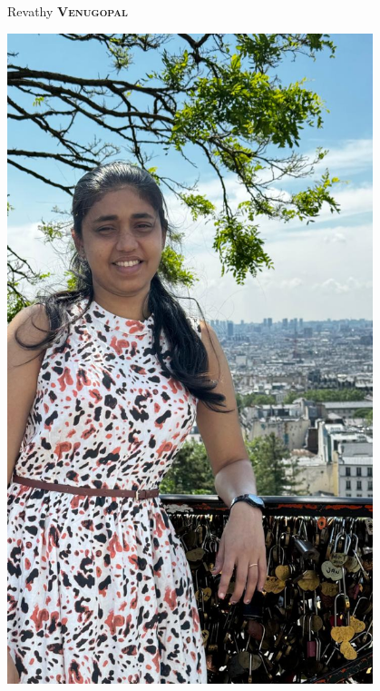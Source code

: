 \documentclass[11pt, a4paper]{article}
\begin{document}
\setlength{\topskip}{0pt}
\setlength{\parindent}{0pt}
\setlength{\parskip}{0pt}
\setlength{\fboxsep}{0pt}
\pagestyle{empty}
\raggedbottom

\begin{minipage}[t]{0.33\textwidth} %
\colorbox{cvblue}{\begin{minipage}[t][5mm][t]{\textwidth}\null\hfill\null\end{minipage}}

\vspace{-.2ex} %
\colorbox{cvblue!90}{\color{white}  %
\textwidth\relax%
\begin{minipage}[t][293mm][t]{0.82\textwidth}
\raggedright
\vspace*{2.5ex}

\Large Revathy \textbf{\textsc{Venugopal}} \normalsize 

\null\hfill\includegraphics[width=0.80\textwidth]{revathy.jpeg}\hfill\null


\end{minipage}}
\end{minipage}
\end{document}
